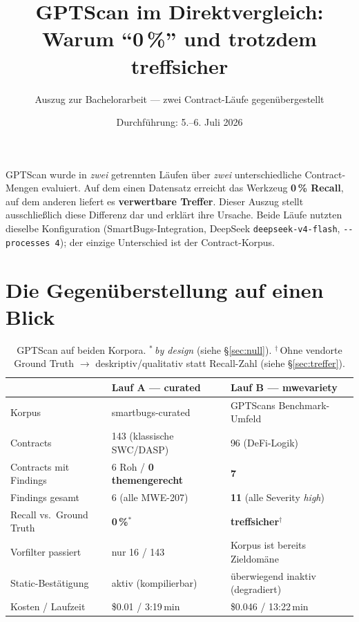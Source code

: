 \documentclass[11pt,a4paper]{scrartcl}
\title{GPTScan im Direktvergleich:\\Warum \enquote{0\,\%} und trotzdem treffsicher}
\subtitle{Auszug zur Bachelorarbeit — zwei Contract-Läufe gegenübergestellt}
\date{Durchführung: 5.--6. Juli 2026}
\newcommand{\code}[1]{\texttt{#1}}
\begin{document}
\maketitle

\noindent
GPTScan wurde in \emph{zwei} getrennten Läufen über \emph{zwei} unterschiedliche
Contract-Mengen evaluiert. Auf dem einen Datensatz erreicht das Werkzeug
\textbf{0\,\% Recall}, auf dem anderen liefert es \textbf{verwertbare Treffer}.
Dieser Auszug stellt ausschließlich diese Differenz dar und erklärt ihre Ursache.
Beide Läufe nutzten dieselbe Konfiguration (SmartBugs-Integration, DeepSeek
\code{deepseek-v4-flash}, \code{-{}-processes 4}); der einzige Unterschied ist der
Contract-Korpus.

\section{Die Gegenüberstellung auf einen Blick}

\begin{table}[h]
\centering
\renewcommand{\arraybackslash}{}
\begin{tabularx}{\linewidth}{@{}L{4.1cm}XX@{}}
\toprule
 & \textbf{Lauf A — curated} & \textbf{Lauf B — mwevariety} \\
\midrule
Korpus & smartbugs-curated & GPTScans Benchmark-Umfeld \\
Contracts & 143 (klassische SWC/DASP) & 96 (DeFi-Logik) \\
Contracts mit Findings & 6 Roh / \textbf{0 themengerecht} & \textbf{7} \\
Findings gesamt & 6 (alle MWE-207) & \textbf{11} (alle Severity \emph{high}) \\
Recall vs.\ Ground Truth & \textcolor{bad}{\textbf{0\,\%}}$^{*}$ & \textcolor{good}{\textbf{treffsicher}}$^{\dagger}$ \\
Vorfilter passiert & nur 16 / 143 & Korpus ist bereits Zieldomäne \\
Static-Bestätigung & aktiv (kompilierbar) & überwiegend inaktiv (degradiert) \\
Kosten / Laufzeit & \$0.01 / 3:19\,min & \$0.046 / 13:22\,min \\
\bottomrule
\end{tabularx}
\caption{GPTScan auf beiden Korpora. $^{*}$\,\emph{by design} (siehe \S\ref{sec:null}).
$^{\dagger}$\,Ohne vendorte Ground Truth $\rightarrow$ deskriptiv/qualitativ statt Recall-Zahl (siehe \S\ref{sec:treffer}).}
\end{table}
\end{document}
